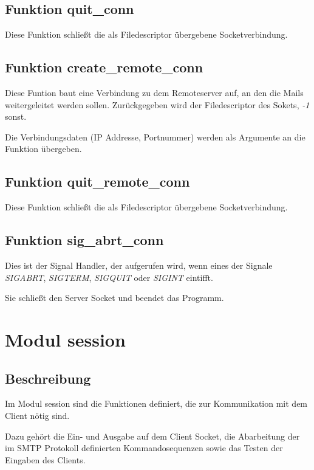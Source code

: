 \documentclass[pdftex,final,a4paper,10pt,notitlepage,halfparskip]{scrreprt}
\begin{document}
\subsection{Funktion quit\_conn}\label{fn:quit_conn}
Diese Funktion schließt die als Filedescriptor übergebene Socketverbindung.


\subsection{Funktion create\_remote\_conn}\label{fn:create_remote_conn}
Diese Funtion baut eine Verbindung zu dem Remoteserver auf, an den die Mails weitergeleitet werden sollen. Zurückgegeben wird der Filedescriptor des Sokets, \textit{-1} sonst.

Die Verbindungsdaten (IP Addresse, Portnummer) werden als Argumente an die Funktion übergeben.

\subsection{Funktion quit\_remote\_conn}\label{fn:quit_remote_conn}
Diese Funktion schließt die als Filedescriptor übergebene Socketverbindung.

\subsection{Funktion sig\_abrt\_conn}\label{fn:sig_abrt_conn}
Dies ist der Signal Handler, der aufgerufen wird, wenn eines der Signale \textit{SIGABRT}, \textit{SIGTERM}, \textit{SIGQUIT} oder \textit{SIGINT} eintifft. 

Sie schließt den Server Socket und beendet das Programm.





\section{Modul session}\label{mod:session}
\subsection{Beschreibung}
Im Modul session sind die Funktionen definiert, die zur Kommunikation mit dem Client nötig sind. 

Dazu gehört die Ein- und Ausgabe auf dem Client Socket, die Abarbeitung der im SMTP Protokoll definierten Kommandosequenzen sowie das Testen der Eingaben des Clients.
\end{document}
